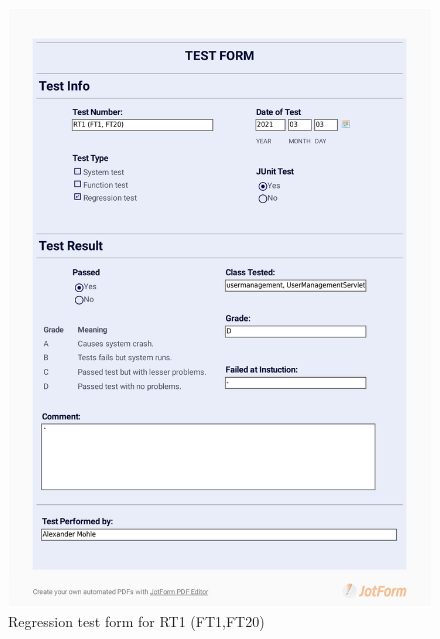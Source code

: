 \documentclass{article}
\begin{document}
  \begin{figure}
     \centering
     \includegraphics[width=13cm]{images/2021-03-03_Alexander_RT1(FT1, FT20)-1.jpg}
     \renewcommand\figurename{Figure}
     \caption{Regression test form for RT1 (FT1,FT20)}
     \label{fig:my_label}
 \end{figure}
 
\end{document}
